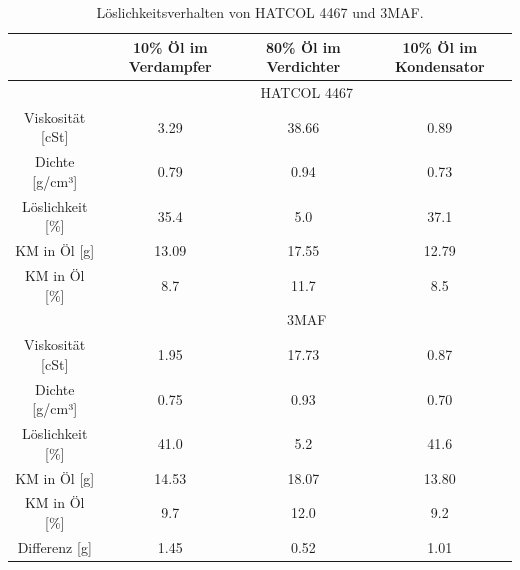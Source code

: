 \begin{table}[h!]
\centering
\caption{Löslichkeitsverhalten von HATCOL 4467 und 3MAF.}
\label{tab:LöslichkeitHC3M}
\begin{tabular}{|cccc|}
\hline
                                           & 10\% Öl im Verdampfer      & 80\% Öl im Verdichter     & 10\% Öl im Kondensator \\ \hline
\multicolumn{1}{|l}{}                      & \multicolumn{3}{c|}{HATCOL 4467}                                                  \\ \hline
\multicolumn{1}{|c|}{Viskosität {[}cSt{]}} & \multicolumn{1}{c|}{3.29}  & \multicolumn{1}{c|}{38.66} & 0.89                    \\
\multicolumn{1}{|c|}{Dichte {[}g/cm³{]}}   & \multicolumn{1}{c|}{0.79}  & \multicolumn{1}{c|}{0.94}  & 0.73                    \\
\multicolumn{1}{|c|}{Löslichkeit {[}\%{]}} & \multicolumn{1}{c|}{35.4}  & \multicolumn{1}{c|}{5.0}   & 37.1                    \\
\multicolumn{1}{|c|}{KM in Öl {[}g{]}}     & \multicolumn{1}{c|}{13.09} & \multicolumn{1}{c|}{17.55} & 12.79                   \\
\multicolumn{1}{|c|}{KM in Öl {[}\%{]}}    & \multicolumn{1}{c|}{8.7}     & \multicolumn{1}{c|}{11.7}    & 8.5                       \\ \hline
\multicolumn{1}{|l}{}                      & \multicolumn{3}{c|}{3MAF}                                                         \\ \hline
\multicolumn{1}{|c|}{Viskosität {[}cSt{]}} & \multicolumn{1}{c|}{1.95}  & \multicolumn{1}{c|}{17.73} & 0.87                    \\
\multicolumn{1}{|c|}{Dichte {[}g/cm³{]}}   & \multicolumn{1}{c|}{0.75}  & \multicolumn{1}{c|}{0.93}  & 0.70                    \\
\multicolumn{1}{|c|}{Löslichkeit {[}\%{]}} & \multicolumn{1}{c|}{41.0}  & \multicolumn{1}{c|}{5.2}   & 41.6                    \\
\multicolumn{1}{|c|}{KM in Öl {[}g{]}}     & \multicolumn{1}{c|}{14.53} & \multicolumn{1}{c|}{18.07} & 13.80                   \\
\multicolumn{1}{|c|}{KM in Öl {[}\%{]}}    & \multicolumn{1}{c|}{9.7}    & \multicolumn{1}{c|}{12.0}    & 9.2                       \\ \hline
\multicolumn{1}{|c|}{Differenz {[}g{]}}    & \multicolumn{1}{c|}{1.45}  & \multicolumn{1}{c|}{0.52}  & 1.01                    \\ \hline
\end{tabular}
\end{table}














